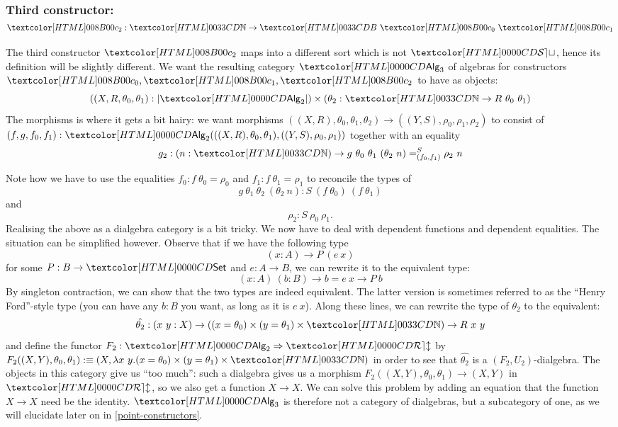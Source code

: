 \subsubsection{Third constructor: $\Bcii : \natty \to \Bty\ \Aco\ \Aci$}

The third constructor $\Bcii$ maps into a different sort which is not
$\SET$, hence its definition will be slightly different. We want the
resulting category $\Alg_3$ of algebras for constructors
$\Aco, \Aci, \Bcii$ to have as objects:
$$
((X,R,\theta_0,\theta_1) : | \Alg_2 |) \times (\theta_2 : \natty \to R\ \theta_0\ \theta_1)
$$
The morphisms is where it gets a bit hairy: we want morphisms
$((X,R),\theta_0,\theta_1,\theta_2) \to ((Y,S),\rho_0,\rho_1,\rho_2)$
to consist of
$(f,g,f_0,f_1) :
\Alg_2(((X,R),\theta_0,\theta_1),((Y,S),\rho_0,\rho_1))$
together with an equality
$$
g_2 : (n : \natty)  \to \pathover{S}{(f_0,f_1)}{g\ \theta_0\ \theta_1\ (\theta_2\ n)}{\rho_2\ n}
$$

Note how we have to use the equalities $f_0 : f\ \theta_0 = \rho_0$ and
$f_1 : f\ \theta_1 = \rho_1$ to reconcile the types of
$$
g\ \theta_1\ \theta_2\ (\theta_2\ n) : S\ (f\ \theta_0)\ (f\ \theta_1)
$$
and 
$$
\rho_2 : S\ \rho_0\ \rho_1 .
$$
Realising the above as a dialgebra category is a bit tricky. We now
have to deal with dependent functions and dependent equalities. The
situation can be simplified however. Observe that if we have the
following type
$$
(x : A) \to P\ (e\ x)
$$
for some $P : B \to \Set$ and $e : A \to B$, we can rewrite it to the
equivalent type:
$$
(x : A)\ (b : B) \to b = e\ x \to P\ b
$$
By singleton contraction, we can show that the two types are indeed
equivalent. The latter version is sometimes referred to as the ``Henry
Ford''-style type (you can have any $b : B$ you want, as long as it is
$e\ x$). Along these lines, we can rewrite the type of $\theta_2$ to the equivalent:
$$
\hat{\theta_2} : (x\ y : X) \to ((x = \theta_0) \times (y = \theta_1) \times \natty) \to R\ x\ y 
$$
and define the functor $F_2 : \Func{\Alg_2}{\REL}$ by
$F_2 ((X,Y),\theta_0,\theta_1) \ddefeq (X , \lambda x\ y . (x =
\theta_0) \times (y = \theta_1) \times \natty)$
in order to see that $\hat{\theta_2}$ is a $(F_2,U_2)$-dialgebra. The
objects in this category give us ``too much'': such a dialgebra gives
us a morphism $F_2((X,Y),\theta_0,\theta_1) \to (X,Y)$ in $\REL$, so
we also get a function $X \to X$. We can solve this problem by adding
an equation that the function $X \to X$ need be the identity. $\Alg_3$
is therefore not a category of dialgebras, but a subcategory of one,
as we will elucidate later on in \cref{point-constructors}.

